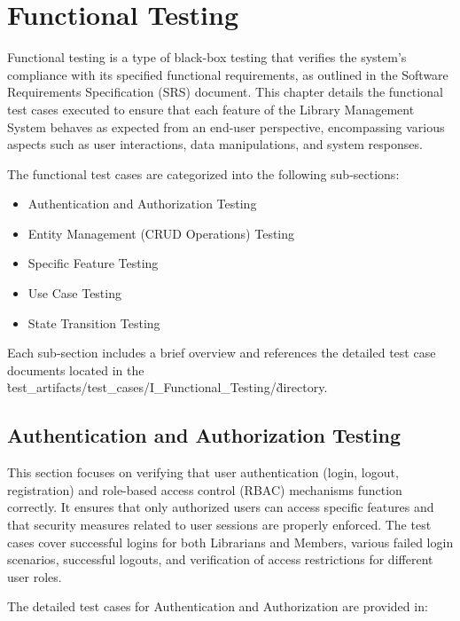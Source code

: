 \chapter{Functional Testing}
\label{chap:functional_testing}

Functional testing is a type of black-box testing that verifies the system's compliance with its specified functional requirements, as outlined in the Software Requirements Specification (SRS) document. This chapter details the functional test cases executed to ensure that each feature of the Library Management System behaves as expected from an end-user perspective, encompassing various aspects such as user interactions, data manipulations, and system responses.

The functional test cases are categorized into the following sub-sections:
\begin{itemize}
    \item Authentication and Authorization Testing
    \item Entity Management (CRUD Operations) Testing
    \item Specific Feature Testing
    \item Use Case Testing
    \item State Transition Testing
\end{itemize}

Each sub-section includes a brief overview and references the detailed test case documents located in the \`test\_artifacts/test\_cases/I\_Functional\_Testing/\` directory.

\section{Authentication and Authorization Testing}
This section focuses on verifying that user authentication (login, logout, registration) and role-based access control (RBAC) mechanisms function correctly. It ensures that only authorized users can access specific features and that security measures related to user sessions are properly enforced. The test cases cover successful logins for both Librarians and Members, various failed login scenarios, successful logouts, and verification of access restrictions for different user roles.

The detailed test cases for Authentication and Authorization are provided in:
\newpage


